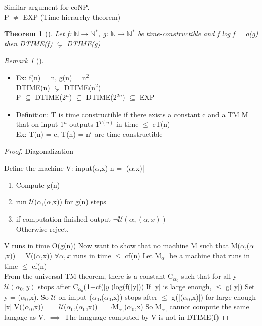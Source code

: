 \documentclass{article}
\newtheorem{theorem}{Theorem}
\theoremstyle{definition}
\theoremstyle{remark}
\newtheorem*{remark}{Remark}
\newcommand{\Thm}[3]{\begin{theorem}[#1]\label{#2}#3\end{theorem}}
\newcommand{\Rem}[3]{\begin{remark}[#1]\label{#2}#3\end{remark}}
\newcommand{\Proof}[1]{\begin{proof}#1\end{proof}}
\newcommand{\N}{\mathbb{N}}
\begin{document}
Similar argument for coNP.\\

P $\neq$ EXP (Time hierarchy theorem)
\Thm{}{}{Let f: $\N \rightarrow \N^*$, g: $\N \rightarrow \N^*$ be time-constructible and f log f = o(g) then DTIME(f) $\subsetneq$ DTIME(g)}

\Rem{}{}{\begin{itemize}
		\item Ex: f(n) = n, g(n) = n$^2$\\
		DTIME(n) $\subsetneq$ DTIME(n$^2$)\\
		P $\subseteq$ DTIME(2$^n$) $\subsetneq$ DTIME(2$^{2n}$) $\subseteq$ EXP
		\item Definition: T is time constructible if there exists a constant c and a TM M that on input 1$^n$ outputs 1$^{T(n)}$ in time $\leq$ cT(n)\\
		Ex: T(n) = c, T(n) = n$^c$ are time constructible
	\end{itemize}}
\Proof{Diagonalization
	
	Define the machine V: input($\alpha$,x) n = |($\alpha$,x)|
	\begin{enumerate}
		\item Compute g(n)
		\item run $\mathcal{U}$($\alpha$,($\alpha$,x)) for g(n) steps
		\item if computation finished output $\neg\mathcal{U}(\alpha,(\alpha,x))$\\
		Otherwise reject.
	\end{enumerate}
	V runs in time O(g(n))
	Now want to show that no machine M such that M($\alpha$,($\alpha$,x)) = V(($\alpha$,x)) $\forall\alpha,x$ runs in time $\leq$ cf(n)
	Let M$_{\alpha_0}$ be a machine that runs in time $\leq$ cf(n)\\
	From the universal TM theorem, there is a constant C$_{\alpha_0}$ such that for all y\\
	$\mathcal{U}(\alpha_0,y)$ stops after C$_{\alpha_0}$(1+cf($|y|$)log(f(|y|))
	If |y| is large enough, $\leq$ g(|y|)
	Set y = ($\alpha_0$,x). So $\mathcal{U}$ on imput ($\alpha_0$,($\alpha_0$,x)) stops after $\leq$ g(|($\alpha_0$,x)|) for large enough |x|
	V(($\alpha_0$,x)) = $\neg\mathcal{U}$($\alpha_0$,($\alpha_0$,x)) = $\neg$M$_{\alpha_0}$($\alpha_0$,x)
	So M$_{\alpha_0}$ cannot compute the same langage as V. $\implies$ The language computed by V is not in DTIME(f)}
\end{document}
